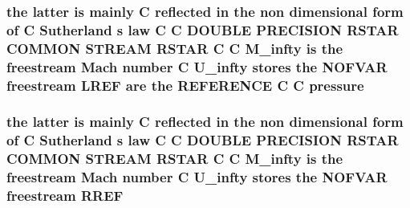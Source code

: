 \hypertarget{home_2abonfi_2_c_f_d__codes_2_eul_f_s_83_84_2include_2stream_8com_a0facbcffae9f2ce2b94119850b5fc3d3}{
\subsubsection[{pressure}]{\setlength{\rightskip}{0pt plus 5cm}the latter is mainly C reflected in the non dimensional form of C Sutherland s law C C D\-O\-U\-B\-L\-E P\-R\-E\-C\-I\-S\-I\-O\-N R\-S\-T\-A\-R C\-O\-M\-M\-O\-N S\-T\-R\-E\-A\-M R\-S\-T\-A\-R C C {\bf M\-\_\-infty} is the freestream Mach number C {\bf U\-\_\-infty} stores the N\-O\-F\-V\-A\-R freestream {\bf L\-R\-E\-F} {\bf are} the R\-E\-F\-E\-R\-E\-N\-C\-E C C pressure}}\label{home_2abonfi_2_c_f_d__codes_2_eul_f_s_83_84_2include_2stream_8com_a0facbcffae9f2ce2b94119850b5fc3d3}
\hypertarget{home_2abonfi_2_c_f_d__codes_2_eul_f_s_83_84_2include_2stream_8com_a79112f231fb3da56eef3fc61c1e77bbd}{
\subsubsection[{R\-R\-E\-F}]{\setlength{\rightskip}{0pt plus 5cm}the latter is mainly C reflected in the non dimensional form of C Sutherland s law C C D\-O\-U\-B\-L\-E P\-R\-E\-C\-I\-S\-I\-O\-N R\-S\-T\-A\-R C\-O\-M\-M\-O\-N S\-T\-R\-E\-A\-M R\-S\-T\-A\-R C C {\bf M\-\_\-infty} is the freestream Mach number C {\bf U\-\_\-infty} stores the N\-O\-F\-V\-A\-R freestream R\-R\-E\-F}}\label{home_2abonfi_2_c_f_d__codes_2_eul_f_s_83_84_2include_2stream_8com_a79112f231fb3da56eef3fc61c1e77bbd}
